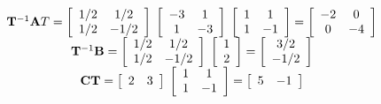 \[
\begin{array}{c}
 {\bf{T}}^{ - 1} {\bf{A}}T = \left[ {\begin{array}{*{20}c}
   {{1 \mathord{\left/
 {\vphantom {1 2}} \right.
 \kern-\nulldelimiterspace} 2}} & {{1 \mathord{\left/
 {\vphantom {1 2}} \right.
 \kern-\nulldelimiterspace} 2}}  \\
   {{1 \mathord{\left/
 {\vphantom {1 2}} \right.
 \kern-\nulldelimiterspace} 2}} & { - {1 \mathord{\left/
 {\vphantom {1 2}} \right.
 \kern-\nulldelimiterspace} 2}}  \\
\end{array}} \right]\;\left[ {\begin{array}{*{20}c}
   { - 3} & 1  \\
   1 & { - 3}  \\
\end{array}} \right]\;\left[ {\begin{array}{*{20}c}
   1 & 1  \\
   1 & { - 1}  \\
\end{array}} \right] = \left[ {\begin{array}{*{20}c}
   { - 2} & 0  \\
   0 & { - 4}  \\
\end{array}} \right] \\ 
 {\bf{T}}^{ - 1} {\bf{B}} = \left[ {\begin{array}{*{20}c}
   {{1 \mathord{\left/
 {\vphantom {1 2}} \right.
 \kern-\nulldelimiterspace} 2}} & {{1 \mathord{\left/
 {\vphantom {1 2}} \right.
 \kern-\nulldelimiterspace} 2}}  \\
   {{1 \mathord{\left/
 {\vphantom {1 2}} \right.
 \kern-\nulldelimiterspace} 2}} & { - {1 \mathord{\left/
 {\vphantom {1 2}} \right.
 \kern-\nulldelimiterspace} 2}}  \\
\end{array}} \right]\;\left[ {\begin{array}{*{20}c}
   1  \\
   2  \\
\end{array}} \right] = \left[ {\begin{array}{*{20}c}
   {{3 \mathord{\left/
 {\vphantom {3 2}} \right.
 \kern-\nulldelimiterspace} 2}}  \\
   { - {1 \mathord{\left/
 {\vphantom {1 2}} \right.
 \kern-\nulldelimiterspace} 2}}  \\
\end{array}} \right] \\ 
 {\bf{CT}} = \left[ {\begin{array}{*{20}c}
   2 & 3  \\
\end{array}} \right]\;\left[ {\begin{array}{*{20}c}
   1 & 1  \\
   1 & { - 1}  \\
\end{array}} \right] = \left[ {\begin{array}{*{20}c}
   5 & { - 1}  \\
\end{array}} \right] \\ 
 \end{array}
\]
